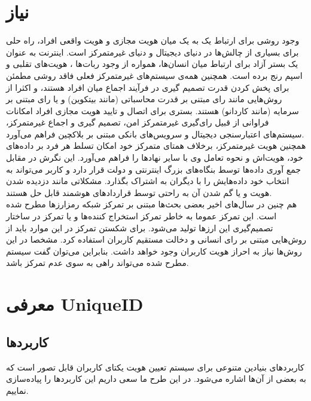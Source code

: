 \documentclass{article}
\begin{document}
\section{ نیاز }
وجود روشی برای ارتباط یک به یک میان هویت مجازی و هویت واقعی افراد، راه حلی برای بسیاری از چالش‌ها در دنیای دیجیتال و دنیای غیرمتمرکز است. اینترنت به عنوان یک بستر آزاد برای ارتباط میان انسان‌ها، همواره از وجود ربات‌ها ، هویت‌های تقلبی و اسپم رنج برده است. همچنین همه‌ی سیستم‌های غیرمتمرکز فعلی فاقد روشی مطمئن برای پخش کردن قدرت تصمیم گیری در فرآیند اجماع میان افراد هستند، و اکثرا از روش‌هایی مانند رای مبتنی بر قدرت محاسباتی (مانند بیتکوین) و یا رای مبتنی بر سرمایه (مانند کاردانو) هستند. بستری برای اتصال و تایید هویت مجازی افراد امکانات فراوانی از قبیل رای‌گیری غیرمتمرکز امن، تصمیم گیری و اجماع غیرمتمرکز، سیستم‌های اعتبارسنجی دیجیتال و سرویس‌های بانکی مبتنی بر بلاکچین فراهم می‌آورد.
\\
همچنین هویت غیرمتمرکز، برخلاف همتای متمرکز خود امکان تسلط هر فرد بر داده‌های خود، هویت‌اش و نحوه تعامل وی با سایر نهادها را فراهم می‌آورد. این نگرش در مقابل جمع آوری داده‌ها توسط بنگاه‌های بزرگ اینترنتی و دولت قرار دارد و کاربر می‌تواند به انتخاب خود داده‌هایش را با دیگران به اشتراک بگذارد. مشکلاتی مانند دزدیده شدن هویت و یا گم شدن آن به راحتی توسط قراردادهای هوشمند قابل حل هستند.
\\
هم چنین در سال‌های اخیر بعضی بحث‌ها مبتنی بر تمرکز شبکه رمزارزها مطرح شده است. این تمرکز عموما به خاطر تمرکز استخراج کننده‌ها و یا تمرکز در ساختار تصمیم‌گیری این ارزها تولید می‌شود. برای شکستن تمرکز در این موارد باید از روش‌هایی مبتنی بر رای انسانی و دخالت مستقیم کاربران استفاده کرد. مشخصا در این روش‌ها نیاز به احراز هویت کاربران وجود خواهد داشت. بنابراین می‌توان گفت سیستم مطرح شده می‌تواند راهی به سوی عدم تمرکز باشد.



\section{ معرفی UniqueID}

\subsection*{کاربردها }
کاربردهای بنیادین متنوعی برای سیستم تعیین هویت یکتای کاربران قابل تصور است که به بعضی از آن‌ها اشاره می‌شود. در این طرح ما سعی داریم این کاربردها را پیاده‌سازی نماییم.
\\
\end{document}
